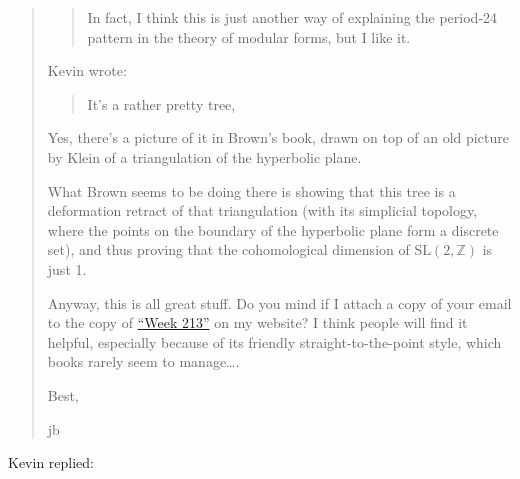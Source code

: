 \documentclass{article}
\begin{document}
\begin{quote}
\begin{quote}
In fact, I think this is just another way of explaining the period-24
pattern in the theory of modular forms, but I like it.
\end{quote}

Kevin wrote:

\begin{quote}
It's a rather pretty tree,
\end{quote}

Yes, there's a picture of it in Brown's book, drawn on top of an old
picture by Klein of a triangulation of the hyperbolic plane.

What Brown seems to be doing there is showing that this tree is a
deformation retract of that triangulation (with its simplicial topology,
where the points on the boundary of the hyperbolic plane form a discrete
set), and thus proving that the cohomological dimension of
\(\mathrm{SL}(2,\mathbb{Z})\) is just 1.

Anyway, this is all great stuff. Do you mind if I attach a copy of your
email to the copy of \protect\hyperlink{week213}{``Week 213''} on my
website? I think people will find it helpful, especially because of its
friendly straight-to-the-point style, which books rarely seem to
manage\ldots.

Best,

jb
\end{quote}

Kevin replied:
\end{document}

